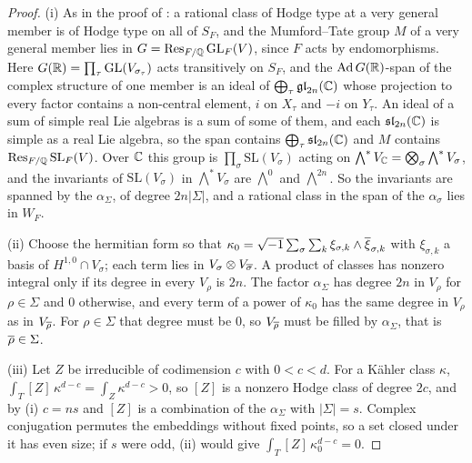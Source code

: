 \begin{proof}
(i) As in the proof of : a rational class of Hodge
type at a very general member is of Hodge type on all of $S_{F}$, and the
Mumford--Tate group $M$ of a very general member lies in
$G=\operatorname{Res}_{F/\mathbb{Q}}\mathrm{GL}_{F}(V)$, since $F$ acts by endomorphisms. Here
$G(\mathbb{R})=\prod_{\tau}\mathrm{GL}(V_{\sigma_{\tau}})$ acts transitively on
$S_{F}$, and the $\mathrm{Ad}\,G(\mathbb{R})$-span of the complex structure of one
member is an ideal of $\bigoplus_{\tau}\mathfrak{gl}_{2n}(\mathbb{C})$ whose
projection to every factor contains a non-central element, $i$ on $X_{\tau}$
and $-i$ on $Y_{\tau}$. An ideal of a sum of simple real Lie algebras is a
sum of some of them, and each $\mathfrak{sl}_{2n}(\mathbb{C})$ is simple as a real
Lie algebra, so the span contains $\bigoplus_{\tau}\mathfrak{sl}_{2n}(\mathbb{C})$
and $M$ contains $\operatorname{Res}_{F/\mathbb{Q}}\mathrm{SL}_{F}(V)$. Over $\mathbb{C}$ this group is
$\prod_{\sigma}\mathrm{SL}(V_{\sigma})$ acting on
$\bigwedge^{*}V_{\mathbb{C}}=\bigotimes_{\sigma}\bigwedge^{*}V_{\sigma}$, and the
invariants of $\mathrm{SL}(V_{\sigma})$ in $\bigwedge^{*}V_{\sigma}$ are
$\bigwedge^{0}$ and $\bigwedge^{2n}$. So the invariants are spanned by the
$\alpha_{\Sigma}$, of degree $2n|\Sigma|$, and a rational class in the span
of the $\alpha_{\sigma}$ lies in $W_{F}$.

(ii) Choose the hermitian form so that $\kappa_{0}=
\sqrt{-1}\sum_{\sigma}\sum_{k}\xi_{\sigma,k}\wedge\overline{\xi}_{\sigma,k}$ with
$\xi_{\sigma,k}$ a basis of $H^{1,0}\cap V_{\sigma}$; each term lies in
$V_{\sigma}\otimes V_{\overline{\sigma}}$. A product of classes has nonzero
integral only if its degree in every $V_{\rho}$ is $2n$. The factor
$\alpha_{\Sigma}$ has degree $2n$ in $V_{\rho}$ for $\rho\in\Sigma$ and $0$
otherwise, and every term of a power of $\kappa_{0}$ has the same degree in
$V_{\rho}$ as in $V_{\overline{\rho}}$. For $\rho\in\Sigma$ that degree must be
$0$, so $V_{\overline{\rho}}$ must be filled by $\alpha_{\Sigma}$, that is
$\overline{\rho}\in\Sigma$.

(iii) Let $Z$ be irreducible of codimension $c$ with $0<c<d$. For a K\"ahler
class $\kappa$, $\int_{T}[Z]\,\kappa^{d-c}=\int_{Z}\kappa^{d-c}>0$, so $[Z]$ is
a nonzero Hodge class of degree $2c$, and by (i) $c=ns$ and $[Z]$ is a
combination of the $\alpha_{\Sigma}$ with $|\Sigma|=s$. Complex conjugation
permutes the embeddings without fixed points, so a set closed under it has
even size; if $s$ were odd, (ii) would give $\int_{T}[Z]\,\kappa_{0}^{d-c}=0$.
\end{proof}

